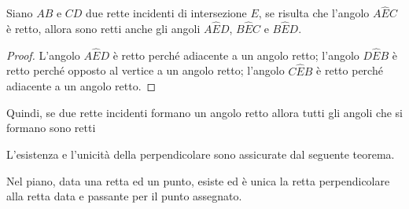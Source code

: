 \begin{proprieta}
Siano $AB$ e $CD$ due rette incidenti di intersezione $E$, se risulta che l'angolo $A\widehat{E}C$ è retto, allora sono retti anche gli angoli $A\widehat{E}D$, $B\widehat{E}C$ e $B\widehat{E}D$.
\end{proprieta}


\begin{proof}
L'angolo $A\widehat{E}D$ è retto perché adiacente a un angolo retto;
l’angolo $D\widehat{E}B$ è retto perché opposto al vertice a un angolo retto;
l’angolo $C\widehat{E}B$ è retto perché adiacente a un angolo retto.
\end{proof}

Quindi, se due rette incidenti formano un angolo retto allora tutti gli angoli che si formano sono retti

L’esistenza e l’unicità della perpendicolare sono assicurate dal seguente teorema.

\begin{teorema}
Nel piano, data una retta ed un punto, esiste ed è unica la retta perpendicolare alla retta data e passante per il punto assegnato.
\end{teorema}


